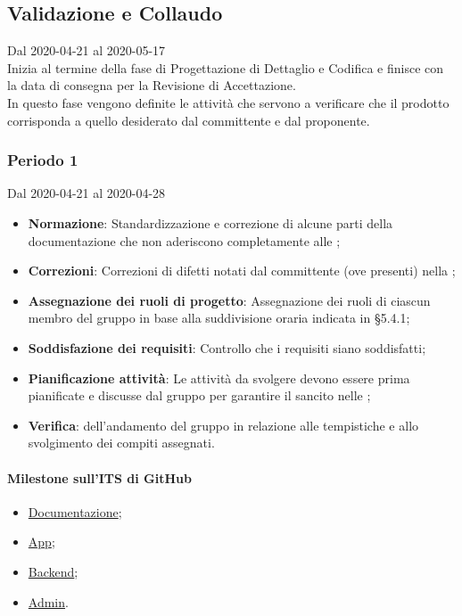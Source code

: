 \subsection{Validazione e Collaudo}
Dal 2020-04-21 al 2020-05-17\\
Inizia al termine della fase di Progettazione di Dettaglio e Codifica e finisce con la data di consegna per la Revisione di Accettazione.\\
In questo fase vengono definite le attività che servono a verificare che il prodotto corrisponda a quello desiderato dal committente e dal proponente.

\subsubsection{Periodo 1} 
Dal 2020-04-21 al 2020-04-28
\begin{itemize}
	\item \textbf{Normazione}: Standardizzazione e correzione di alcune parti della documentazione che non aderiscono completamente alle \NdP{};
	\item \textbf{Correzioni}: Correzioni di difetti notati dal committente (ove presenti) nella ;
	\item \textbf{Assegnazione dei ruoli di progetto}: Assegnazione dei ruoli di ciascun membro del gruppo in base alla suddivisione oraria indicata in §5.4.1;
	\item \textbf{Soddisfazione dei requisiti}: Controllo che i requisiti siano soddisfatti;
	\item \textbf{Pianificazione attività}: Le attività da svolgere devono essere prima pianificate e discusse dal gruppo per garantire il  sancito nelle \NdP{};
	\item \textbf{Verifica}:  dell'andamento del gruppo in relazione alle tempistiche e allo svolgimento dei compiti assegnati.
\end{itemize}
\paragraph{Milestone sull'ITS di GitHub}
\begin{itemize}
	\item \href{https://github.com/qb-team/Stalker-Documentazione/milestone/15}{Documentazione};
	\item \href{https://github.com/qb-team/Stalker-App/milestone/4}{App};
	\item \href{https://github.com/qb-team/Stalker-Backend/milestone/5}{Backend};
	\item \href{https://github.com/qb-team/Stalker-Admin/milestone/5}{Admin}.
\end{itemize}

